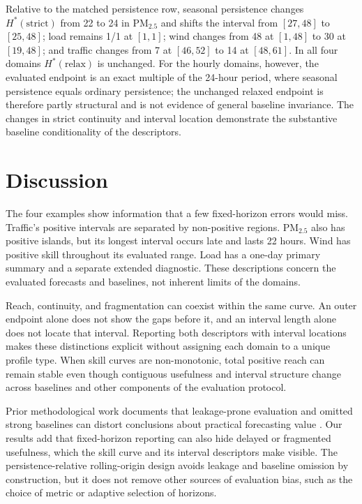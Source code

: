 \documentclass[pdflatex]{sn-jnl}
\begin{document}
Relative to the matched persistence row, seasonal persistence changes
$H^*(\mathrm{strict})$ from 22 to 24 in PM$_{2.5}$ and shifts the interval
from $[27,48]$ to $[25,48]$; load remains 1/1 at $[1,1]$; wind changes from
48 at $[1,48]$ to 30 at $[19,48]$; and traffic changes from 7 at $[46,52]$
to 14 at $[48,61]$. In all four domains $H^*(\mathrm{relax})$ is unchanged.
For the hourly domains, however, the evaluated endpoint is an exact multiple
of the 24-hour period, where seasonal persistence equals ordinary persistence;
the unchanged relaxed endpoint is therefore partly structural and is not
evidence of general baseline invariance. The changes in strict continuity and
interval location demonstrate the substantive baseline conditionality of the
descriptors.



\section{Discussion}
The four examples show information that a few fixed-horizon errors would
miss. Traffic's positive intervals are separated by non-positive regions.
PM$_{2.5}$ also has positive islands, but its longest interval occurs late
and lasts 22 hours. Wind has positive skill throughout its evaluated range.
Load has a one-day primary summary and a separate extended diagnostic.
These descriptions concern the evaluated forecasts and baselines, not
inherent limits of the domains.

Reach, continuity, and fragmentation can coexist within the same curve.
An outer endpoint alone does not show the gaps before it, and an interval
length alone does not locate that interval. Reporting both descriptors
with interval locations makes these distinctions explicit without
assigning each domain to a unique profile type. When skill curves are
non-monotonic, total positive reach can remain stable even though
contiguous usefulness and interval structure change across baselines and
other components of the evaluation protocol.

Prior methodological work documents that leakage-prone evaluation and omitted strong baselines can distort conclusions about practical forecasting value \citep{hewamalage2023dmkd}. Our results add that fixed-horizon reporting can also hide delayed or fragmented usefulness, which the skill curve and its interval descriptors make visible. The persistence-relative rolling-origin design avoids leakage and baseline omission by construction, but it does not remove other sources of evaluation bias, such as the choice of metric or adaptive selection of horizons.
\end{document}
